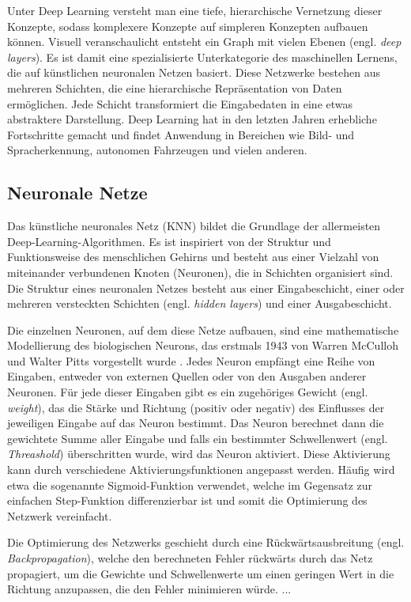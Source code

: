 Unter Deep Learning versteht man eine tiefe, hierarchische Vernetzung dieser Konzepte, sodass komplexere Konzepte auf simpleren Konzepten aufbauen können. Visuell veranschaulicht entsteht ein Graph mit vielen Ebenen (engl. \textit{deep layers}). Es ist damit eine spezialisierte Unterkategorie des maschinellen Lernens, die auf künstlichen neuronalen Netzen basiert. Diese Netzwerke bestehen aus mehreren Schichten, die eine hierarchische Repräsentation von Daten ermöglichen. Jede Schicht transformiert die Eingabedaten in eine etwas abstraktere Darstellung. Deep Learning hat in den letzten Jahren erhebliche Fortschritte gemacht und findet Anwendung in Bereichen wie Bild- und Spracherkennung, autonomen Fahrzeugen und vielen anderen.

\subsection{Neuronale Netze}

Das künstliche neuronales Netz (KNN) bildet die Grundlage der allermeisten Deep-Learning-Algorithmen. Es ist inspiriert von der Struktur und Funktionsweise des menschlichen Gehirns und besteht aus einer Vielzahl von miteinander verbundenen Knoten (Neuronen), die in Schichten organisiert sind. Die Struktur eines neuronalen Netzes besteht aus einer Eingabeschicht, einer oder mehreren versteckten Schichten (engl. \textit{hidden layers}) und einer Ausgabeschicht.

Die einzelnen Neuronen, auf dem diese Netze aufbauen, sind eine mathematische Modellierung des biologischen Neurons, das erstmals 1943 von Warren McCulloh und Walter Pitts vorgestellt wurde \parencite{Zhou2021}. Jedes Neuron empfängt eine Reihe von Eingaben, entweder von externen Quellen oder von den Ausgaben anderer Neuronen. Für jede dieser Eingaben gibt es ein zugehöriges Gewicht (engl. \textit{weight}), das die Stärke und Richtung (positiv oder negativ) des Einflusses der jeweiligen Eingabe auf das Neuron bestimmt. Das Neuron berechnet dann die gewichtete Summe aller Eingabe und falls ein bestimmter Schwellenwert (engl. \textit{Threashold}) überschritten wurde, wird das Neuron aktiviert. Diese Aktivierung kann durch verschiedene Aktivierungsfunktionen angepasst werden. Häufig wird etwa die sogenannte Sigmoid-Funktion verwendet, welche im Gegensatz zur einfachen Step-Funktion differenzierbar ist und somit die Optimierung des Netzwerk vereinfacht.

Die Optimierung des Netzwerks geschieht durch eine Rückwärtsausbreitung (engl. \textit{Backpropagation}), welche den berechneten Fehler rückwärts durch das Netz propagiert, um die Gewichte und Schwellenwerte um einen geringen Wert in die Richtung anzupassen, die den Fehler minimieren würde. ...

